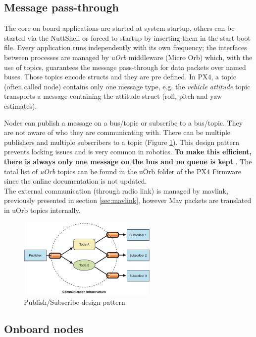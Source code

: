 \subsection{Message pass-through}
The core on board applications are started at system startup, others can be started via the NuttShell or forced to startup by inserting them in the start boot file. Every application runs independently with its own frequency; the interfaces between processes are managed by \textit{uOrb} middleware (Micro Orb) which, with the use of topics, guarantees the message pass-through for data packets over named buses. Those topics encode structs and they are pre defined. In PX4, a topic (often called node) contains only one message type, e.g. the \textit{vehicle attitude} topic transports a message containing the attitude struct (roll, pitch and yaw estimates).\par Nodes can publish a message on a bus/topic or subscribe to a bus/topic. They are not aware of who they are communicating with. There can be multiple publishers and multiple subscribers to a topic (Figure \ref{figure:pubsub}). This design pattern prevents locking issues and is very common in robotics. \textbf{To make this efficient, there is always only one message on the bus and no queue is kept} \cite{uOrb}. The total list of \textit{uOrb} topics can be found in the uOrb folder of the PX4 Firmware since the online documentation is not updated. \\

\noindent
The external communication (through radio link) is managed by mavlink, previously presented in section \ref{sec:mavlink}, however Mav packets are translated in uOrb topics internally.   

\begin{figure}[h]
	\centering
	\noindent
	\includegraphics[width=0.6\textwidth]{pub_sub.PNG}
	\caption{Publish/Subscribe design pattern}
	\label{figure:pubsub}
\end{figure}

\subsection{Onboard nodes}


